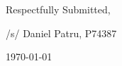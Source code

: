 \documentclass[12pt,\documentclassflag]{michiganCourtOfAppealsBrief}
\begin{document}
{ \setlength{\leftskip}{3.5in}
  Respectfully Submitted,

  /s/ Daniel Patru, P74387

\today

  \setlength{\leftskip}{0pt}}


\newpage\empty%



  




\end{document}
